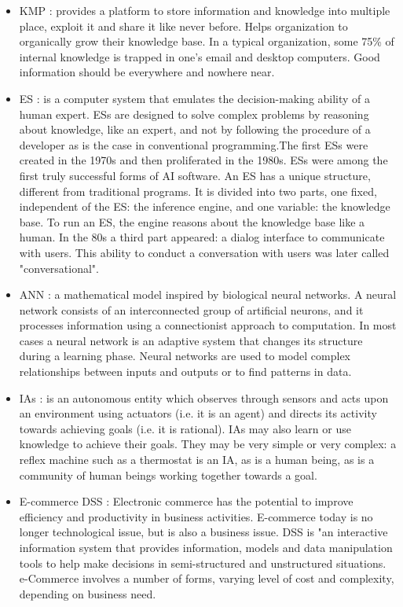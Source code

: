 \documentclass[12pt,a4paper,final,twoside,onecolumn,titlepage]{book}
\begin{document}
\begin{itemize}
\item \gls{KMP} \cite{Wiki-KMP}: provides a platform to store information and knowledge into multiple place, exploit it and share it like never before. Helps organization to organically grow their knowledge base. In a typical organization, some 75\% of internal knowledge is trapped in one's email and desktop computers. Good information should be everywhere and nowhere near.
\item \gls{ES} \cite{Wiki-ES}: is a computer system that emulates the decision-making ability of a human expert. \gls{ES}s are designed to solve complex problems by reasoning about knowledge, like an expert, and not by following the procedure of a developer as is the case in conventional programming.The first \gls{ES}s were created in the 1970s and then proliferated in the 1980s. \gls{ES}s were among the first truly successful forms of AI software. 
An \gls{ES} has a unique structure, different from traditional programs. It is divided into two parts, one fixed, independent of the \gls{ES}: the inference engine, and one variable: the knowledge base. To run an \gls{ES}, the engine reasons about the knowledge base like a human. In the 80s a third part appeared: a dialog interface to communicate with users. This ability to conduct a conversation with users was later called "conversational".
\item \gls{ANN} \cite{Wiki-ANN}: a mathematical model inspired by biological neural networks. A neural network consists of an interconnected group of artificial neurons, and it processes information using a connectionist approach to computation. In most cases a neural network is an adaptive system that changes its structure during a learning phase. Neural networks are used to model complex relationships between inputs and outputs or to find patterns in data.
\item \gls{IA}s \cite{Wiki-IA}: is an autonomous entity which observes through sensors and acts upon an environment using actuators (i.e. it is an agent) and directs its activity towards achieving goals (i.e. it is rational). \gls{IA}s may also learn or use knowledge to achieve their goals. They may be very simple or very complex: a reflex machine such as a thermostat is an \gls{IA}, as is a human being, as is a community of human beings working together towards a goal.
\item E-commerce \gls{DSS} \cite{Wiki-eCommerce}: Electronic commerce has the potential to improve efficiency and productivity in business activities. E-commerce today is no longer technological issue, but is also a business issue. \gls{DSS} is "an interactive information system that provides information, models and data manipulation tools to help make decisions in semi-structured and unstructured situations. e-Commerce involves a number of forms, varying level of cost and complexity, depending on business need.
\end{itemize}
\end{document}
